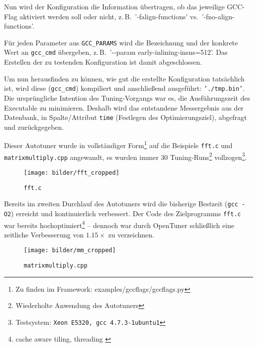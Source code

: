 \documentclass[a4paper,11pt]{scrartcl}
\newcommand{\zB}{\mbox{z.\,B.}\xspace}
\newcommand{\vs}{\mbox{vs.}\xspace}
\begin{document}

Nun wird der Konfiguration die Information übertragen, ob das jeweilige GCC-Flag
aktiviert werden soll oder nicht, \zB~'-falign-functions' \vs~'-fno-align-functions'.


Für jeden Parameter aus \texttt{GCC\_PARAMS} wird die Bezeichnung und der
konkrete Wert an \texttt{gcc\_cmd} übergeben, \zB~'-{}-param early-inlining-insns=512'.
Das Erstellen der zu testenden Konfiguration ist damit abgeschlossen. \newline


Um nun herausfinden zu können, wie gut die erstellte Konfiguration tatsächlich ist, 
wird diese (\texttt{gcc\_cmd}) kompiliert und anschließend ausgeführt: \texttt{'./tmp.bin'}.
Die ursprüngliche Intention des Tuning-Vorgangs war es, die Ausführungszeit des 
Executable zu minimieren. Deshalb wird das entstandene Messergebnis aus der Datenbank,
in Spalte/Attribut \texttt{time} (Festlegen des Optimierungsziel), abgefragt und zurückgegeben. \newline

Dieser Autotuner wurde in vollständiger Form\footnote{Zu finden im Framework: 
examples/gccflags/gccflags.py} auf die Beispiele \texttt{fft.c} 
und \texttt{matrixmultiply.cpp} angewandt, es wurden immer 30 Tuning-Runs\footnote{Wiederholte Anwendung 
des Autotuners} vollzogen\footnote{Testsystem: \texttt{Xeon E5320, gcc 4.7.3-1ubuntu1}}.

\begin{figure}[h]
\begin{center}
\texttt{[image: bilder/fft\_cropped]}
\cite[S.~7]{OT-paper} \caption{\texttt{fft.c}}
\end{center}
\end{figure}

Bereits im zweiten Durchlauf des Autotuners wird die bisherige Bestzeit (\texttt{gcc -O2}) 
erreicht und kontinuierlich verbessert. Der Code des Zielprogramms \texttt{fft.c} war bereits
hochoptimiert\footnote{cache aware tiling, threading \cite[S.~6]{OT-paper}} 
-- dennoch war durch OpenTuner schließlich eine zeitliche Verbesserung von $1.15 \times$  zu verzeichnen.

\begin{figure}[h]
\begin{center}
\texttt{[image: bilder/mm\_cropped]}
\cite[S.~7]{OT-paper} \caption{\texttt{matrixmultiply.cpp}}
\end{center}
\end{figure}
\end{document}
